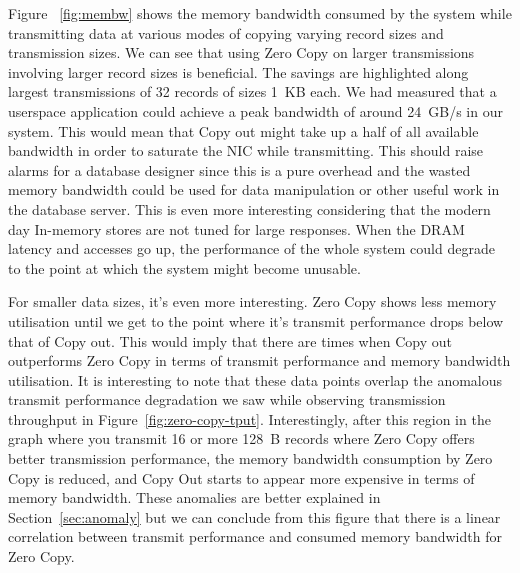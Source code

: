 Figure ~\ref{fig:membw} shows the memory bandwidth consumed by the system while transmitting data at various modes 
of copying varying record sizes and transmission sizes. We can see that using Zero Copy on larger transmissions involving 
larger record sizes is beneficial. The savings are highlighted along largest transmissions of 32 records of sizes 1~KB each. 
 We had measured that a userspace application could achieve a peak bandwidth of around 24~GB/s in our system. This would mean that Copy out 
 might take up a half of all available bandwidth in order to saturate the NIC while transmitting. This should raise alarms for a database 
 designer since this is a pure overhead and the wasted memory bandwidth could be used for data manipulation or other useful work in the database 
 server. This is even more interesting considering that the modern day In-memory stores are not tuned for large responses.
  When the DRAM latency and accesses go up, the performance of the whole system could degrade to the point at which the system might become unusable.

For smaller data sizes, it's even more interesting. Zero Copy shows less memory utilisation until we get to the point where it's transmit performance 
drops below that of Copy out. This would imply that there are times when Copy out outperforms Zero Copy in terms of transmit performance and 
memory bandwidth utilisation. It is interesting to note that these data points overlap the anomalous transmit performance 
degradation we saw while observing transmission throughput in Figure~\ref{fig:zero-copy-tput}. Interestingly, after this region in the graph 
where you transmit 16 or more 128~B records where Zero Copy offers better transmission performance, the memory bandwidth consumption by Zero Copy 
is reduced, and Copy Out starts to appear more expensive in terms of memory bandwidth. These anomalies are better explained in Section~\ref{sec:anomaly} but we 
can conclude from this figure that there is a linear correlation between transmit performance and consumed memory bandwidth for Zero Copy.
\newline


